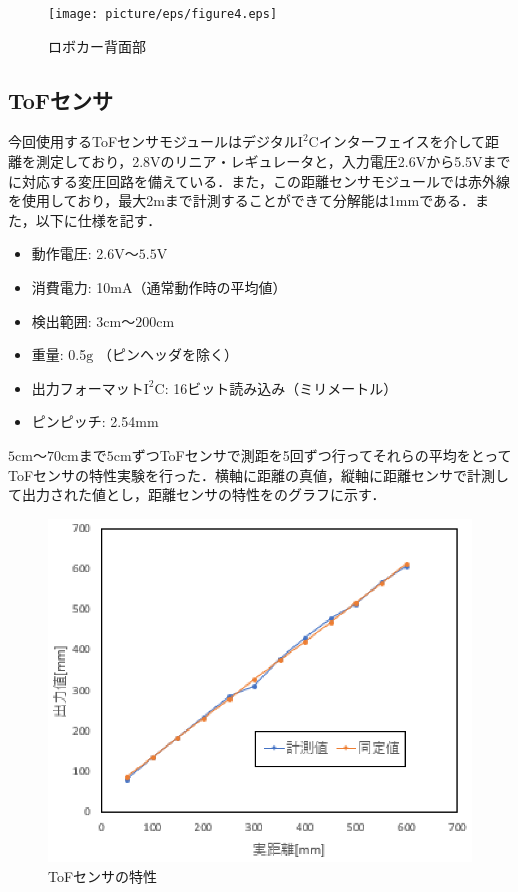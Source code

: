 \begin{figure}[htb]
 \centering
  \texttt{[image: picture/eps/figure4.eps]}
  \caption{ロボカー背面部}
  \label{fig::figure4}
\end{figure}

\subsection{ToFセンサ}
今回使用するToFセンサモジュールはデジタル$\mathrm{I^{2}C}$インターフェイスを介して距離を測定しており，2.8$\mathrm{V}$のリニア・レギュレータと，入力電圧2.6$\mathrm{V}$から5.5$\mathrm{V}$までに対応する変圧回路を備えている．また，この距離センサモジュールでは赤外線を使用しており，最大2$\mathrm{m}$まで計測することができて分解能は1$\mathrm{mm}$である．また，以下に仕様を記す\cite{tof_sensor1}．
\begin{itemize}
 \item 動作電圧: 2.6$\mathrm{V}〜5.5\mathrm{V}$
 \item 消費電力: 10$\mathrm{mA}$（通常動作時の平均値）
 \item 検出範囲: 3$\mathrm{cm}〜200\mathrm{cm}$
 \item 重量: 0.5$\mathrm{g}$ （ピンヘッダを除く）
 \item 出力フォーマット$\mathrm{I^{2}C}$: 16ビット読み込み（ミリメートル）
 \item ピンピッチ: 2.54$\mathrm{mm}$ 
\end{itemize}

$\mathrm{5cm}〜\mathrm{70cm}$まで$\mathrm{5cm}$ずつToFセンサで測距を5回ずつ行ってそれらの平均をとってToFセンサの特性実験を行った．横軸に距離の真値，縦軸に距離センサで計測して出力された値とし，距離センサの特性をのグラフに示す．

\begin{figure}[htb]
  \centering
  \includegraphics[width=0.5\hsize]{picture/eps/graph.eps}
  \caption{ToFセンサの特性}
  \label{fig::tof_graph}
 \end{figure}

